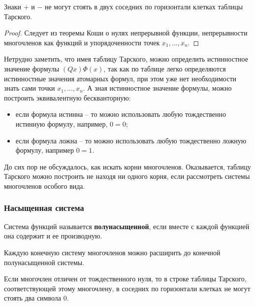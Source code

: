 \begin{proposal}
    Знаки $+$ и $-$ не могут стоять в двух соседних по горизонтали клетках таблицы Тарского.
\end{proposal}
\begin{proof}
    Следует из теоремы Коши о нулях непрерывной функции, непрерывности многочленов как функций и упорядоченности точек $x_1, ..., x_n$.
\end{proof}

Нетрудно заметить, что имея таблицу Тарского, можно определить истинностное значение формулы $(Qx)\Phi(x)$, так как по таблице легко определяются истинностные значения атомарных формул, при этом уже нет необходимости знать сами точки $x_1, ..., x_n$. А зная истинностное значение формулы, можно построить эквивалентную бескванторную:
\begin{itemize}
    \item если формула истинна -- то можно использовать любую тождественно истинную формулу, например, $0=0$;
    \item если формула ложна -- то можно использовать любую тождественно ложную формулу, например $0=1$.
\end{itemize}

До сих пор не обсуждалось, как искать корни многочленов. Оказывается, таблицу Тарского можно построить не находя ни одного корня, если рассмотреть системы многочленов особого вида.

\subsubsection{Насыщенная система}

\begin{definition}\cite{lect1}
    Система функций называется \textbf{полунасыщенной}, если вместе с каждой функцией она содержит и ее производную.
\end{definition}

\begin{proposal}\cite{lect1}
    Каждую конечную систему многочленов можно расширить до конечной полунасыщенной системы.
\end{proposal}

\begin{proposal}\label{two zero}\cite{lect1}
    Если многочлен отличен от тождественного нуля, то в строке таблицы Тарского, соответствующей этому многочлену, в соседних по горизонтали клетках не могут стоять два символа 0.
\end{proposal}

